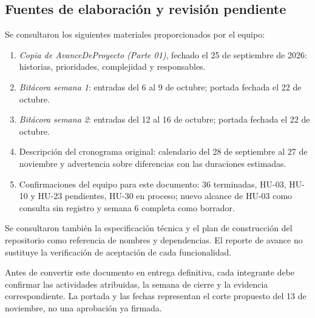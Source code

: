 \subsection{Fuentes de elaboración y revisión pendiente}
Se consultaron los siguientes materiales proporcionados por el equipo:
\begin{enumerate}[nosep,leftmargin=*]
\item \textit{Copia de AvanceDeProyecto (Parte 01)}, fechado el 25 de
septiembre de 2026: historias, prioridades, complejidad y responsables.
\item \textit{Bitácora semana 1}: entradas del 6 al 9 de octubre; portada
fechada el 22 de octubre.
\item \textit{Bitácora semana 2}: entradas del 12 al 16 de octubre; portada
fechada el 22 de octubre.
\item Descripción del cronograma original: calendario del 28 de septiembre
al 27 de noviembre y advertencia sobre diferencias con las duraciones
estimadas.
\item Confirmaciones del equipo para este documento: 36 terminadas,
HU-03, HU-10 y HU-23 pendientes, HU-30 en proceso; nuevo alcance de HU-03
como consulta sin registro y semana 6 completa como borrador.
\end{enumerate}

Se consultaron también la especificación técnica y el plan de construcción
del repositorio como referencia de nombres y dependencias. El reporte de
avance no sustituye la verificación de aceptación de cada funcionalidad.

Antes de convertir este documento en entrega definitiva, cada integrante
debe confirmar las actividades atribuidas, la semana de cierre y la evidencia
correspondiente. La portada y las fechas representan el corte propuesto del
13 de noviembre, no una aprobación ya firmada.
